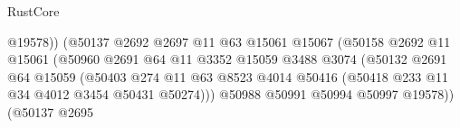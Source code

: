 \begin{lexlean}{RustCore}
\begin{coremodule}
                                                @19578))
                                            (@50137
                                              @2692
                                              @2697
                                              @11
                                              @63
                                              @15061
                                              @15067
                                              (@50158
                                                @2692
                                                @11
                                                @15061
                                                (@50960
                                                  @2691
                                                  @64
                                                  @11
                                                  @3352
                                                  @15059
                                                  @3488
                                                  @3074
                                                  (@50132
                                                    @2691
                                                    @64
                                                    @15059
                                                    (@50403
                                                      @274
                                                      @11
                                                      @63
                                                      @8523
                                                      @4014
                                                      @50416
                                                      (@50418
                                                        @233
                                                        @11
                                                        @34
                                                        @4012
                                                        @3454
                                                        @50431
                                                        @50274)))
                                                  @50988
                                                  @50991
                                                  @50994
                                                  @50997
                                                  @19578))
                                              (@50137
                                                @2695

\end{coremodule}
\end{lexlean}
